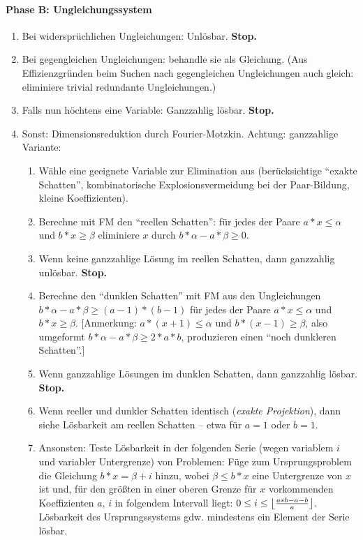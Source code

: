 \paragraph{Phase B: Ungleichungssystem}
\begin{enumerate}
\setcounter{enumi}{\theenumTemp}
\item Bei widersprüchlichen Ungleichungen: Unlösbar. \textbf{Stop.}
\item Bei gegengleichen Ungleichungen: behandle sie als Gleichung.
  (Aus Effizienzgründen beim Suchen nach gegengleichen Ungleichungen
  auch gleich: eliminiere trivial redundante Ungleichungen.)
\item Falls nun höchtens eine Variable: Ganzzahlig lösbar. \textbf{Stop.}
\item Sonst: Dimensionsreduktion durch Fourier-Motzkin. Achtung:
  ganzzahlige Variante:
  \begin{enumerate}
  \item Wähle eine geeignete Variable zur Elimination aus
    (berücksichtige ``exakte Schatten'', kombinatorische
    Explosionsvermeidung bei der Paar-Bildung, kleine Koeffizienten).
  \item Berechne mit FM den ``reellen Schatten'': für jedes der Paare
    $a*x\leq \alpha$ und $b*x\geq \beta$ eliminiere $x$ durch $b*\alpha - a*\beta \geq 0$.
  \item Wenn keine ganzzahlige Lösung im reellen Schatten, dann
      ganzzahlig unlösbar. \textbf{Stop.}
  \item Berechne den ``dunklen Schatten'' mit FM aus den Ungleichungen
    $b*\alpha - a*\beta \geq (a\!-\!1)*(b\!-\!1)$ für jedes der Paare
    $a*x\leq \alpha$ und $b*x\geq \beta$. [Anmerkung: $a*(x\!+\!1)\leq \alpha$ und
    $b*(x\!-\!1)\geq \beta$, also umgeformt $b*\alpha - a*\beta \geq 2*a*b$,
    produzieren einen ``noch dunkleren Schatten''.]
  \item Wenn ganzzahlige Lösungen im dunklen Schatten, dann ganzzahlig
    lösbar. \textbf{Stop.}
  \item Wenn reeller und dunkler Schatten identisch (\emph{exakte
      Projektion}), dann siehe Lösbarkeit am reellen Schatten -- etwa
    für $a=1$ oder $b=1$.
  \item Ansonsten: Teste Lösbarkeit in der folgenden Serie (wegen
    variablem $i$ und variabler Untergrenze) von Problemen: Füge zum
    Ursprungsproblem die Gleichung $b*x=\beta + i$ hinzu, wobei
    $\beta\leq b*x$ eine Untergrenze von $x$ ist und, für den
    größten in einer oberen Grenze für $x$ vorkommenden Koeffizienten
    $a$, $i$ in folgendem Intervall liegt: $0\leq i\leq
    \left\lfloor{a*b-a-b\over a}\right\rfloor$.  Lösbarkeit des
    Ursprungssystems gdw. mindestens ein Element der Serie lösbar.
  \end{enumerate}
\end{enumerate}



